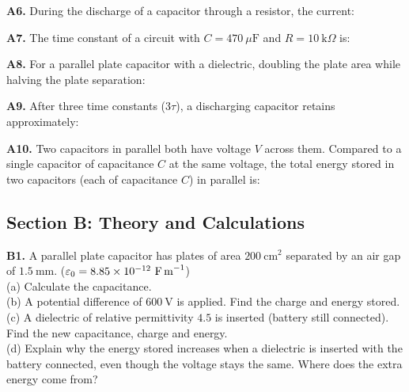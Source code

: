 \begin{exercisebox}[22]
\textbf{A6.} During the discharge of a capacitor
through a resistor, the current:


\vspace{0.4cm}

\textbf{A7.} The time constant of a circuit with
$C = 470\ \mu\text{F}$ and $R = 10\ \text{k}\Omega$ is:


\vspace{0.4cm}

\textbf{A8.} For a parallel plate capacitor with
a dielectric, doubling the plate area while halving
the plate separation:


\vspace{0.4cm}

\textbf{A9.} After three time constants ($3\tau$),
a discharging capacitor retains approximately:


\vspace{0.4cm}

\textbf{A10.} Two capacitors in parallel both have
voltage $V$ across them. Compared to a single
capacitor of capacitance $C$ at the same voltage,
the total energy stored in two capacitors (each
of capacitance $C$) in parallel is:


\vspace{0.6cm}

\subsection*{Section B: Theory and Calculations}

\textbf{B1.} A parallel plate capacitor has plates
of area $200\ \text{cm}^2$ separated by an air gap
of $1.5\ \text{mm}$.
($\varepsilon_0 = 8.85\times10^{-12}\ \text{F\,m}^{-1}$)\\[4pt]
(a) Calculate the capacitance.\\
(b) A potential difference of $600\ \text{V}$ is
applied. Find the charge and energy stored.\\
(c) A dielectric of relative permittivity $4.5$
is inserted (battery still connected). Find the
new capacitance, charge and energy.\\
(d) Explain why the energy stored increases when
a dielectric is inserted with the battery connected,
even though the voltage stays the same. Where does
the extra energy come from?
\hfill{}


\end{exercisebox}

